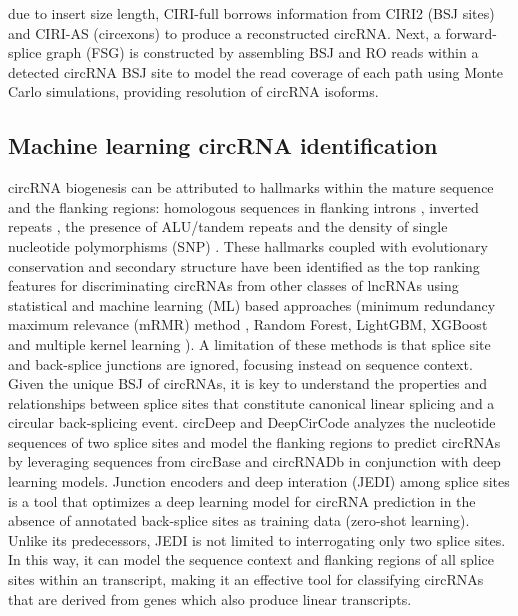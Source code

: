 \documentclass[journal,review,submit,pdftex,moreauthors]{Definitions/mdpi}
\begin{document}
due to insert size length, CIRI-full borrows information from CIRI2 (BSJ sites) and CIRI-AS (circexons) to produce a reconstructed circRNA. Next, a forward-splice graph (FSG) is constructed by assembling BSJ and RO reads within a detected circRNA BSJ site to model the read coverage of each path using Monte Carlo simulations, providing resolution of circRNA isoforms. 

\subsection*{Machine learning circRNA identification}
circRNA biogenesis can be attributed to hallmarks within the mature sequence and the flanking regions: homologous sequences in flanking introns \cite{Ivanov2015Jan}, inverted repeats \cite{Dubin1995Dec}, the presence of ALU/tandem repeats \cite{Jeck2012Dec} and the density of single nucleotide polymorphisms (SNP) \cite{Thomas2014Aug}. These hallmarks coupled with evolutionary conservation and secondary structure have been identified as the top ranking features for discriminating circRNAs from other classes of lncRNAs using statistical and machine learning (ML) based approaches (minimum redundancy maximum relevance (mRMR) method \cite{Chen2018Feb}, Random Forest, LightGBM, XGBoost \cite{StackCirRNAPred} and multiple kernel learning \cite{PredcircRNA}). A limitation of these methods is that splice site and back-splice junctions are ignored, focusing instead on sequence context. Given the unique BSJ of circRNAs, it is key to understand the properties and relationships between splice sites that constitute canonical linear splicing and a circular back-splicing event. circDeep \cite{circDeep} and DeepCirCode \cite{DeepCirCode} analyzes the nucleotide sequences of two splice sites and model the flanking regions to predict circRNAs by leveraging sequences from circBase and circRNADb in conjunction with deep learning models. Junction encoders and deep interation (JEDI) among splice sites \cite{JEDI} is a tool that optimizes a deep learning model for circRNA prediction in the absence of annotated back-splice sites as training data (zero-shot learning). Unlike its predecessors, JEDI is not limited to interrogating only two splice sites. In this way, it can model the sequence context and flanking regions of all splice sites within an transcript, making it an effective tool for classifying circRNAs that are derived from genes which also produce linear transcripts.
\end{document}
